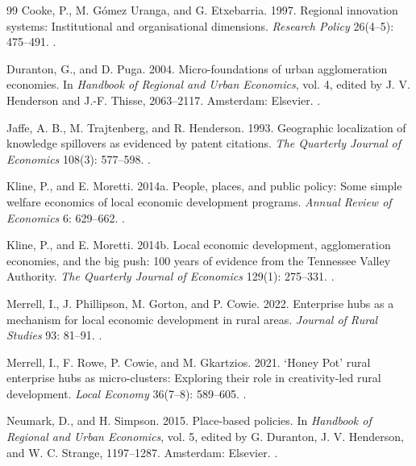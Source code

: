 \begin{thebibliography}{99}
Cooke, P., M. G{\'o}mez Uranga, and G. Etxebarria. 1997. Regional innovation systems: Institutional and organisational dimensions. \emph{Research Policy} 26(4--5): 475--491. .

Duranton, G., and D. Puga. 2004. Micro-foundations of urban agglomeration economies. In \emph{Handbook of Regional and Urban Economics}, vol. 4, edited by J. V. Henderson and J.-F. Thisse, 2063--2117. Amsterdam: Elsevier. .

Jaffe, A. B., M. Trajtenberg, and R. Henderson. 1993. Geographic localization of knowledge spillovers as evidenced by patent citations. \emph{The Quarterly Journal of Economics} 108(3): 577--598. .

Kline, P., and E. Moretti. 2014a. People, places, and public policy: Some simple welfare economics of local economic development programs. \emph{Annual Review of Economics} 6: 629--662. .

Kline, P., and E. Moretti. 2014b. Local economic development, agglomeration economies, and the big push: 100 years of evidence from the Tennessee Valley Authority. \emph{The Quarterly Journal of Economics} 129(1): 275--331. .

Merrell, I., J. Phillipson, M. Gorton, and P. Cowie. 2022. Enterprise hubs as a mechanism for local economic development in rural areas. \emph{Journal of Rural Studies} 93: 81--91. .

Merrell, I., F. Rowe, P. Cowie, and M. Gkartzios. 2021. `Honey Pot' rural enterprise hubs as micro-clusters: Exploring their role in creativity-led rural development. \emph{Local Economy} 36(7--8): 589--605. .

Neumark, D., and H. Simpson. 2015. Place-based policies. In \emph{Handbook of Regional and Urban Economics}, vol. 5, edited by G. Duranton, J. V. Henderson, and W. C. Strange, 1197--1287. Amsterdam: Elsevier. .


\end{thebibliography}
